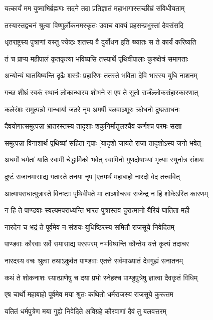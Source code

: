 \twolineshloka
{यत्कार्यं मम युष्माभिर्ब्रह्मणः सदने तदा}
{प्रतिज्ञातं महाभागास्तच्छीघ्रं संविधीयताम्}


\twolineshloka
{तस्यास्तद्वचनं श्रुत्वा विष्णुर्लोकनमस्कृतः}
{उवाच वाक्यं प्रहसन्प्रभुस्तां देवसंसदि}


\twolineshloka
{धृतराष्ट्रस्य पुत्राणां यस्तु ज्येष्ठः शतस्य वै}
{दुर्योधन इति ख्यातः स ते कार्यं करिष्यति}


\twolineshloka
{तं च प्राप्य महीपालं कृतकृत्या भविष्यसि}
{तस्यार्थे पृथिवीपालाः कुरुक्षेत्रं समागताः}


\twolineshloka
{अन्योन्यं घातयिष्यन्ति दृढैः शस्त्रैः प्रहारिणः}
{ततस्ते भविता देवि भारस्य युधि नाशनम्}


\twolineshloka
{गच्छ शीघ्रं स्वकं स्थानं लोकान्धारय शोभने}
{स एष ते सुतो राजँल्लोकसंहारकारणात्}


\twolineshloka
{कलेरंशः समुत्पन्नो गान्धार्या जठरे नृप}
{अमर्षी बलवाञ्शूरः क्रोधनो दुष्प्रसाधनः}


\twolineshloka
{दैवयोगात्समुत्पन्ना भ्रातरस्तस्य तादृशाः}
{शकुनिर्मातुलश्चैव कर्णश्च परमः सखा}


\twolineshloka
{समुत्पन्ना विनाशार्थं पृथिव्यां सहिता नृपाः}
{[यादृशो जायते राजा तादृशोऽस्य जनो भवेत्}


\twolineshloka
{अधर्मो धर्मतां याति स्वामी चेद्धार्मिको भवेत्}
{स्वामिनो गुणदोषाभ्यां भृत्याः स्युर्नात्र संशयः}


\twolineshloka
{दुष्टं राजानमासाद्य गतास्ते तनया नृप}
{]एतमर्थं महाबाहो नारदो वेद तत्त्ववित्}


\twolineshloka
{आत्मापराधात्पुत्रास्ते विनष्टाः पृथिवीपते}
{मा ताञ्शोचस्व राजेन्द्र न हि शोकेऽस्ति कारणम्}


\twolineshloka
{न हि ते पाण्डवाः स्वल्पमपराध्यन्ति भारत}
{पुत्रास्तव दुरात्मानो यैरियं घातिता मही}


\twolineshloka
{नारदेन च भद्रं ते पूर्वमेव न संशयः}
{युधिष्ठिरस्य समितौ राजसूये निवेदितम्}


\twolineshloka
{पाण्डवाः कौरवाः सर्वे समासाद्य परस्परम्}
{नभविष्यन्ति कौन्तेय यत्ते कृत्यं तदाचर}


\twolineshloka
{नारदस्य वचः श्रुत्वा तथाऽकुर्वत पाण्डवाः}
{एतत्ते सर्वमाख्यातं देवगुह्यं सनातनम्}


\twolineshloka
{कथं ते शोकनाशः स्यात्प्राणेषु च दया प्रभो}
{स्नेहश्च पाण्डुपुत्रेषु ज्ञात्वा दैवकृतं विधिम्}


\twolineshloka
{एष चार्थो महाबाहो पूर्वमेव मया श्रुतः}
{कथितो धर्मराजस्य राजसूये कुरूत्तम}


\twolineshloka
{यतितं धर्मपुत्रेण मया गुह्ये निवेदिते}
{अविग्रहे कौरवाणां दैवं तु बलवत्तरम्}


